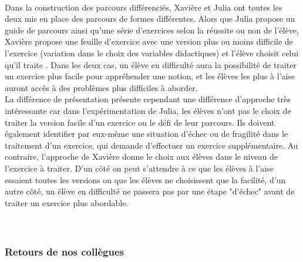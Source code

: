 \paragraph*{}Dans la construction des parcours différenciés, Xavière et Julia ont toutes les deux mis en place des parcours de formes différentes. Alors que Julia propose un guide de parcours ainsi qu'une série d'exercices selon la réussite ou non de l'élève, Xavière propose une feuille d'exercice avec une version plus ou moins difficile de l'exercice (variation dans le choix des variables didactiques) et l'élève choisit celui qu'il traite . Dans les deux cas, un élève en difficulté aura la possibilité de traiter un exercice plus facile pour appréhender une notion, et les élèves les plus à l'aise auront accès à des problèmes plus difficiles à aborder.\\
La différence de présentation présente cependant une différence d'approche très intéressante car dans l'expérimentation de Julia, les élèves n'ont pas le choix de traiter la version facile d'un exercice ou le défi de leur parcours. Ils doivent également identifier par eux-même une situation d'échec ou de fragilité dans le traitement d'un exercice, qui demande d'effectuer un exercice supplémentaire. Au contraire, l'approche de Xavière donne le choix aux élèves dans le niveau de l'exercice à traiter. D'un côté on peut s'attendre à ce que les élèves à l'aise essaient toutes les versions ou que les élèves ne choisissent que la facilité, d'un autre côté, un élève en difficulté ne passera pas par une étape "d'échec" avant de traiter un exercice plus abordable.
\paragraph*{}
\\
\subsubsection{Retours de nos collègues}
